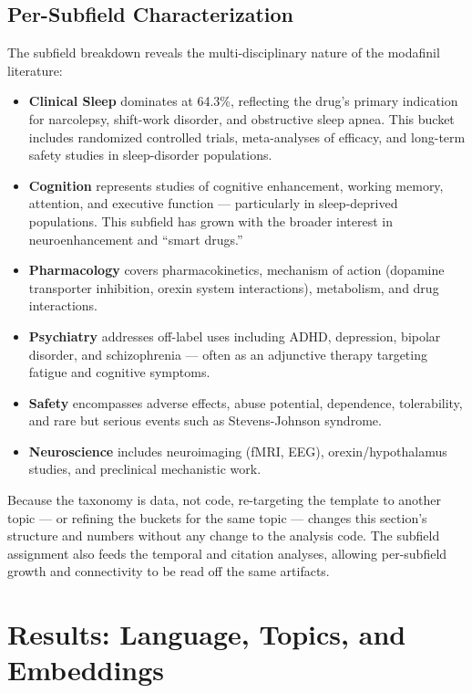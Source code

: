 \documentclass[
  english,
]{article}
\begin{document}
\subsection{Per-Subfield
Characterization}\label{per-subfield-characterization}

The subfield breakdown reveals the multi-disciplinary nature of the
modafinil literature:

\begin{itemize}
\item
  \textbf{Clinical Sleep} dominates at 64.3\%, reflecting the drug's
  primary indication for narcolepsy, shift-work disorder, and
  obstructive sleep apnea. This bucket includes randomized controlled
  trials, meta-analyses of efficacy, and long-term safety studies in
  sleep-disorder populations.
\item
  \textbf{Cognition} represents studies of cognitive enhancement,
  working memory, attention, and executive function --- particularly in
  sleep-deprived populations. This subfield has grown with the broader
  interest in neuroenhancement and ``smart drugs.''
\item
  \textbf{Pharmacology} covers pharmacokinetics, mechanism of action
  (dopamine transporter inhibition, orexin system interactions),
  metabolism, and drug interactions.
\item
  \textbf{Psychiatry} addresses off-label uses including ADHD,
  depression, bipolar disorder, and schizophrenia --- often as an
  adjunctive therapy targeting fatigue and cognitive symptoms.
\item
  \textbf{Safety} encompasses adverse effects, abuse potential,
  dependence, tolerability, and rare but serious events such as
  Stevens-Johnson syndrome.
\item
  \textbf{Neuroscience} includes neuroimaging (fMRI, EEG),
  orexin/hypothalamus studies, and preclinical mechanistic work.
\end{itemize}

Because the taxonomy is data, not code, re-targeting the template to
another topic --- or refining the buckets for the same topic --- changes
this section's structure and numbers without any change to the analysis
code. The subfield assignment also feeds the temporal and citation
analyses, allowing per-subfield growth and connectivity to be read off
the same artifacts.

\newpage

\section{Results: Language, Topics, and
Embeddings}\label{results-language-topics-and-embeddings}
\end{document}
